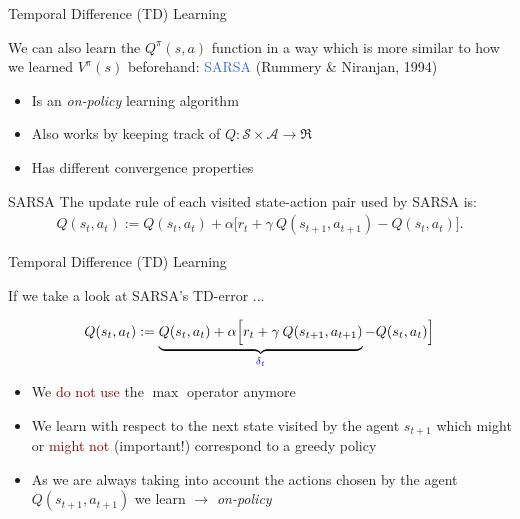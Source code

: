 \documentclass{beamer}
\begin{document}
\begin{frame}{Temporal Difference (TD) Learning}

	We can also learn the $Q^{\pi}(s,a)$ function in a way which is more similar to how we learned $V^{\pi}(s)$ beforehand: \textcolor{RoyalBlue}{SARSA} (Rummery \& Niranjan, 1994)

	\begin{itemize}
		\item Is an \textit{on-policy} learning algorithm
		\item Also works by keeping track of $Q: \mathcal{S} \times \mathcal{A} \rightarrow \Re$ 
		\item Has different convergence properties 

	\end{itemize}

	\begin{block}{SARSA}
		The update rule of each visited state-action pair used by SARSA is:
		\begin{align*}
			Q(s_t,a_t):=Q(s_t,a_t) + \alpha\Big[r_t + \gamma \:Q(s_{t+1},a_{t+1}) - Q(s_t, a_t) \Big].
		\end{align*}
	\end{block}
\end{frame}

\begin{frame}{Temporal Difference (TD) Learning}

		If we take a look at SARSA's TD-error ...

		\begin{align*}
			Q(s_t,a_t):=\underbrace{Q(s_t,a_t) + \alpha\Big[r_t + \gamma \: Q(s_{t+1},a_{t+1})}_{\textcolor{blue}{\delta_t}} - Q(s_t, a_t) \Big]
		\end{align*}


		\begin{itemize}
			\item \onslide<+-> We \textcolor{Maroon}{do not use} the $\max$ operator anymore
			\item \onslide<+-> We learn with respect to the next state visited by the agent $s_{t+1}$ which might or \textcolor{Maroon}{might not} (important!) correspond to a greedy policy
			\item \onslide<+-> As we are always taking into account the actions chosen by the agent $Q(s_{t+1}, a_{t+1})$ we learn $\rightarrow$ \textit{on-policy}
		\end{itemize}

\end{frame}
\end{document}
